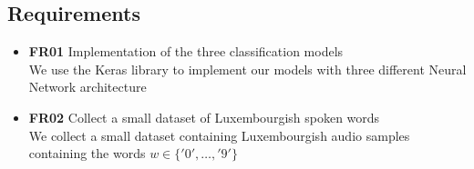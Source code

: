 \subsection{Requirements}


\begin{itemize}
  \item \textbf{FR01} Implementation of the three classification models\\
    We use the Keras library to implement our models with three
    different Neural Network architecture
  \item \textbf{FR02} Collect a small dataset of Luxembourgish spoken words\\
    We collect a small dataset containing Luxembourgish audio samples containing
    the words $w \in \{'0',\dots,'9'\}$
\end{itemize}
